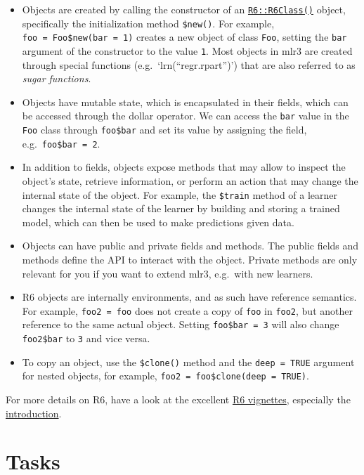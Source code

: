 \documentclass[
]{scrbook}
\providecommand{\tightlist}{%
  \setlength{\itemsep}{0pt}\setlength{\parskip}{0pt}}
\begin{document}
\begin{itemize}
\tightlist
\item
  Objects are created by calling the constructor of an \href{https://www.rdocumentation.org/packages/R6/topics/R6Class}{\texttt{R6::R6Class()}} object, specifically the initialization method \texttt{\$new()}.
  For example, \texttt{foo\ =\ Foo\$new(bar\ =\ 1)} creates a new object of class \texttt{Foo}, setting the \texttt{bar} argument of the constructor to the value \texttt{1}.
  Most objects in mlr3 are created through special functions (e.g.~`lrn(``regr.rpart'')') that are also referred to as \emph{sugar functions}.
\item
  Objects have mutable state, which is encapsulated in their fields, which can be accessed through the dollar operator.
  We can access the \texttt{bar} value in the \texttt{Foo} class through \texttt{foo\$bar} and set its value by assigning the field, e.g.~\texttt{foo\$bar\ =\ 2}.
\item
  In addition to fields, objects expose methods that may allow to inspect the object's state, retrieve information, or perform an action that may change the internal state of the object.
  For example, the \texttt{\$train} method of a learner changes the internal state of the learner by building and storing a trained model, which can then be used to make predictions given data.
\item
  Objects can have public and private fields and methods.
  The public fields and methods define the API to interact with the object.
  Private methods are only relevant for you if you want to extend mlr3, e.g.~with new learners.
\item
  R6 objects are internally environments, and as such have reference semantics.
  For example, \texttt{foo2\ =\ foo} does not create a copy of \texttt{foo} in \texttt{foo2}, but another reference to the same actual object.
  Setting \texttt{foo\$bar\ =\ 3} will also change \texttt{foo2\$bar} to \texttt{3} and vice versa.
\item
  To copy an object, use the \texttt{\$clone()} method and the \texttt{deep\ =\ TRUE} argument for nested objects, for example, \texttt{foo2\ =\ foo\$clone(deep\ =\ TRUE)}.
\end{itemize}

For more details on R6, have a look at the excellent \href{https://r6.r-lib.org/}{R6 vignettes}, especially the \href{https://r6.r-lib.org/articles/Introduction.html}{introduction}.

\hypertarget{tasks}{%
\section{Tasks}\label{tasks}}
\end{document}
